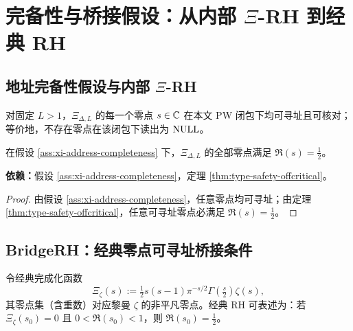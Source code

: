 \section{完备性与桥接假设：从内部 \texorpdfstring{$\Xi$}{Xi}-RH 到经典 RH}\label{sec:bridge-rh}

\subsection{地址完备性假设与内部 \texorpdfstring{$\Xi$}{Xi}-RH}
\begin{assumption}[$\Xi$-切片的地址完备性]\label{ass:xi-address-completeness}
对固定 $L>1$，$\Xi_{\Delta,L}$ 的每一个零点 $s\in\mathbb{C}$ 在本文 PW 闭包下均可寻址且可核对；等价地，不存在零点在该闭包下读出为 $\mathrm{NULL}$。
\end{assumption}

\begin{corollary}[地址完备性推出内部 $\Xi$-RH]\label{cor:xi-rh}
在假设 \ref{ass:xi-address-completeness} 下，$\Xi_{\Delta,L}$ 的全部零点满足 $\Re(s)=\tfrac12$。
\par\noindent\textnormal{\textbf{依赖：}假设 \ref{ass:xi-address-completeness}，定理 \ref{thm:type-safety-offcritical}。}
\end{corollary}

\begin{proof}
由假设 \ref{ass:xi-address-completeness}，任意零点均可寻址；由定理 \ref{thm:type-safety-offcritical}，任意可寻址零点必满足 $\Re(s)=\tfrac12$。
\end{proof}

\subsection{BridgeRH：经典零点可寻址桥接条件}
令经典完成化函数
$$
\Xi_\zeta(s):=\tfrac12 s(s-1)\pi^{-s/2}\Gamma\!\left(\tfrac{s}{2}\right)\zeta(s),
$$
其零点集（含重数）对应黎曼 $\zeta$ 的非平凡零点。经典 RH 可表述为：若 $\Xi_\zeta(s_0)=0$ 且 $0<\Re(s_0)<1$，则 $\Re(s_0)=\tfrac12$。

